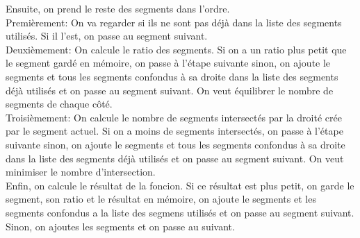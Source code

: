 \documentclass[a4paper,12pt]{report}	%
\begin{document}
    Ensuite, on prend le reste des segments dans l'ordre.\\
    Premièrement: On va regarder si ils ne sont pas déjà dans la liste des segments utilisés. Si il l'est, on passe au segment suivant.\\
    Deuxièmement: On calcule le ratio des segments. Si on a un ratio plus petit que le segment gardé en mémoire,
    on passe à l'étape suivante sinon, on ajoute le segments et tous les segments confondus à sa droite dans la liste des segments déjà utilisés et
    on passe au segment suivant. On veut équilibrer le nombre de segments de chaque côté.\\
    Troisièmement: On calcule le nombre de segments intersectés par la droité crée par le segment actuel. Si on a moins de segments intersectés,
    on passe à l'étape suivante sinon, on ajoute le segments et tous les segments confondus à sa droite dans la liste des segments déjà utilisés et
    on passe au segment suivant. On veut minimiser le nombre d'intersection.\\
    Enfin, on calcule le résultat de la foncion. Si ce résultat est plus petit, on garde le segment, son ratio et le résultat en mémoire,
    on ajoute le segments et les segments confondus a la liste des segmens utilisés et on passe au segment suivant.\\
    Sinon, on ajoutes les segments et on passe au suivant.\\
    
\end{document}

